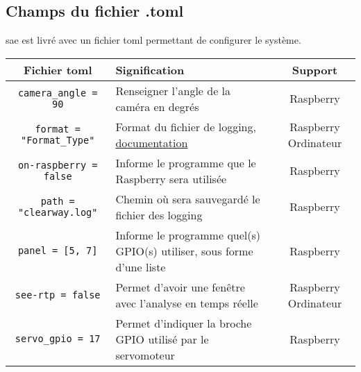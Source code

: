 \subsection{Champs du fichier .toml}
\label{sec:executionTOML_clearWay}
\gls{sae} est livré avec un fichier toml permettant de configurer le système.
\begin{table}[H]
    \centering
    \begin{tabularx}{\linewidth}{|c|X|c|}
        \hline
        \rowcolor{tableColorDark} Fichier toml & Signification & Support   \\
        \hline
        \texttt{camera\_angle = 90}                  & Renseigner l'angle de la caméra en degrés                                                                                                                         & Raspberry               \\\hline
        \texttt{format = "Format\_Type"}             & Format du fichier de logging, \href{https://docs.python.org/3/howto/logging-cookbook.html\#formatting-styles}{documentation}                                      & Raspberry Ordinateur    \\\hline
        \texttt{on-raspberry = false}                & Informe le programme que le Raspberry sera utilisée                                                                                                               & Raspberry               \\\hline
        \texttt{path = "clearway.log"}               & Chemin où sera sauvegardé le fichier des logging                                                                                                                  & Raspberry               \\\hline
        \texttt{panel = [5, 7]}                      & Informe le programme quel(s) GPIO(s) utiliser, sous forme d'une liste                                                                                             & Raspberry               \\\hline
        \texttt{see-rtp = false}                     & Permet d'avoir une fenêtre avec l'analyse en temps réelle                                                                                                         & Raspberry Ordinateur    \\\hline
        \texttt{servo\_gpio = 17}                    & Permet d'indiquer la broche GPIO utilisé par le servomoteur                                                                                                       & Raspberry               \\\hline        

\end{tabularx}
\end{table}
